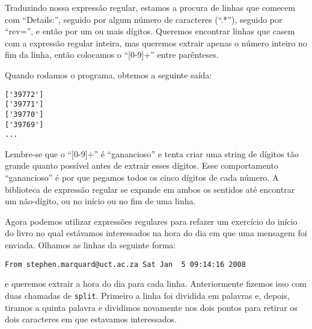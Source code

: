Traduzindo nossa expressão regular, estamos a procura de linhas que comecem
com ``Details:'', seguido por algum número de caracteres (``.*''), seguido
por ``rev='', e então por um ou mais dígitos. Queremos encontrar linhas que
casem com a expressão regular inteira, mas queremos extrair apenas o número
inteiro no fim da linha, então colocamos o ``[0-9]+'' entre parênteses.

Quando rodamos o programa, obtemos a seguinte saída:

\beforeverb
\begin{verbatim}
['39772']
['39771']
['39770']
['39769']
...
\end{verbatim}
\afterverb
%

Lembre-se que o ``[0-9]+'' é ``ganancioso'' e tenta criar uma string de
dígitos tão grande quanto possível antes de extrair esses dígitos. Esse
comportamento ``ganancioso'' é por que pegamos todos os cinco dígitos de
cada número. A biblioteca de expressão regular se expande em ambos os
sentidos até encontrar um não-dígito, ou no início ou no fim de uma linha.

Agora podemos utilizar expressões regulares para refazer um exercício do
início do livro no qual estávamos interessados na hora do dia em que uma
mensagem foi enviada. Olhamos as linhas da seguinte forma: 

\beforeverb
\begin{verbatim}
From stephen.marquard@uct.ac.za Sat Jan  5 09:14:16 2008
\end{verbatim}
\afterverb
%

e queremos extrair a hora do dia para cada linha. Anteriormente fizemos isso
com duas chamadas de {\tt split}. Primeiro a linha foi dividida em palavras
e, depois, tiramos a quinta palavra e dividimos novamente nos dois pontos para
retirar os dois caracteres em que estavamos interessados.

